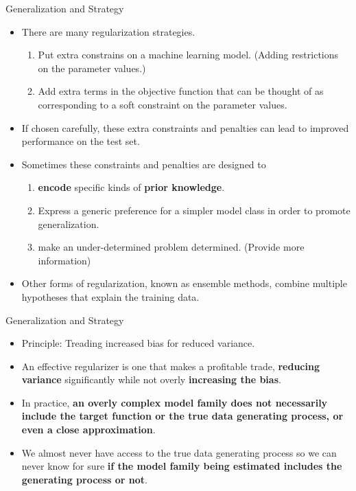 \documentclass[10pt]{beamer}
\begin{document}
	\begin{frame}{Generalization and Strategy}
		\begin{itemize}
			\item There are many regularization strategies.
			\begin{enumerate}
				\pause
				\item Put extra constrains on a machine learning model. (Adding restrictions on the parameter values.)
				\pause
				\item Add extra terms in the objective function that can be thought of as corresponding to a soft constraint on the parameter values.
			\end{enumerate}
			\pause
			\item If chosen carefully, these extra constraints and penalties can lead to improved performance on the test set.
			\pause
			\item Sometimes these constraints and penalties are designed to
			\begin{enumerate}
				\item \textbf{encode} specific kinds of \textbf{prior knowledge}.
				\item Express a generic preference for a simpler model class in order to promote generalization.
				\item make an under-determined problem determined. (Provide more information)
			\end{enumerate}
			\pause
			\item Other forms of regularization, known as ensemble methods, combine multiple hypotheses that explain the training data.
		\end{itemize}
	\end{frame}
	
	\begin{frame}{Generalization and Strategy}
		\begin{itemize}
			\item Principle: Treading increased bias for reduced variance.
			\pause
			\item An effective regularizer is one that makes a profitable trade, \textbf{reducing variance} significantly while not overly \textbf{increasing the bias}.
			\pause
			\item In practice, \textbf{an overly complex model family does not necessarily include the target function or the true data generating process, or even a close approximation}.
			\pause
			\item We almost never have access to the true data generating process so we can never know for sure \textbf{if the model family being estimated includes the generating process or not}.		
		\end{itemize}
	\end{frame}
\end{document}
